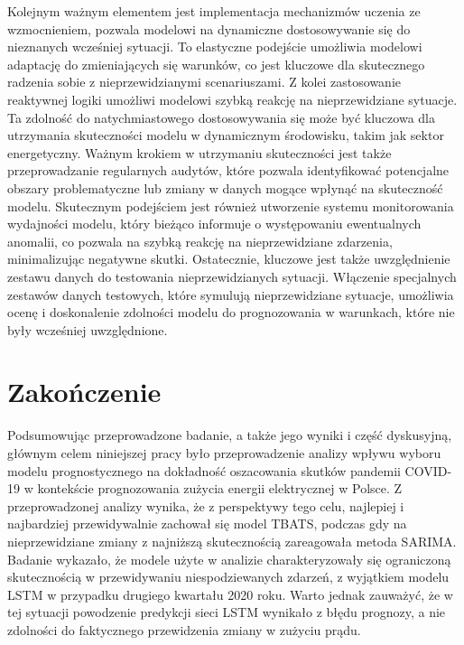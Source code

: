 \documentclass[polish, twoside, 12pt, a4paper]{article}
\theoremstyle{definition}
\theoremstyle{plain}
\theoremstyle{remark}
\begin{document}
Kolejnym ważnym elementem jest implementacja mechanizmów uczenia ze wzmocnieniem, pozwala modelowi na dynamiczne dostosowywanie się do nieznanych wcześniej sytuacji. To elastyczne podejście umożliwia modelowi adaptację do zmieniających się warunków, co jest kluczowe dla skutecznego radzenia sobie z nieprzewidzianymi scenariuszami. Z kolei zastosowanie reaktywnej logiki umożliwi modelowi szybką reakcję na nieprzewidziane sytuacje. Ta zdolność do natychmiastowego dostosowywania się może być kluczowa dla utrzymania skuteczności modelu w dynamicznym środowisku, takim jak sektor energetyczny. Ważnym krokiem w utrzymaniu skuteczności jest także przeprowadzanie regularnych audytów, które pozwala identyfikować potencjalne obszary problematyczne lub zmiany w danych mogące wpłynąć na skuteczność modelu. Skutecznym podejściem jest również utworzenie systemu monitorowania wydajności modelu, który bieżąco informuje o występowaniu ewentualnych anomalii, co pozwala na szybką reakcję na nieprzewidziane zdarzenia, minimalizując negatywne skutki. Ostatecznie, kluczowe jest także uwzględnienie zestawu danych do testowania nieprzewidzianych sytuacji. Włączenie specjalnych zestawów danych testowych, które symulują nieprzewidziane sytuacje, umożliwia ocenę i doskonalenie zdolności modelu do prognozowania w warunkach, które nie były wcześniej uwzględnione. 

\clearpage
\section{Zakończenie}\label{sec:zakonczenie}

Podsumowując przeprowadzone badanie, a także jego wyniki i część dyskusyjną, głównym celem niniejszej pracy było przeprowadzenie analizy wpływu wyboru modelu prognostycznego na dokładność oszacowania skutków pandemii COVID-19 w kontekście prognozowania zużycia energii elektrycznej w Polsce. Z przeprowadzonej analizy wynika, że z perspektywy tego celu, najlepiej i najbardziej przewidywalnie zachował się model TBATS, podczas gdy na nieprzewidziane zmiany z najniższą skutecznością zareagowała metoda SARIMA. Badanie wykazało, że modele użyte w analizie charakteryzowały się ograniczoną skutecznością w przewidywaniu niespodziewanych zdarzeń, z wyjątkiem modelu LSTM w przypadku drugiego kwartału 2020 roku. Warto jednak zauważyć, że w tej sytuacji powodzenie predykcji sieci LSTM wynikało z błędu prognozy, a nie zdolności do faktycznego przewidzenia zmiany w zużyciu prądu. 
\end{document}

